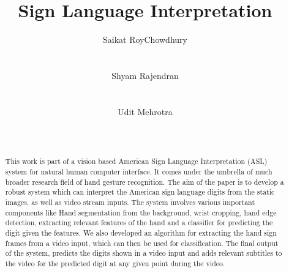\documentclass{acm} %
\begin{document}
\sloppy %

\title{Sign Language Interpretation
}

\author{%
    \alignauthor Saikat RoyChowdhury \\
    \\
    \\
    \alignauthor Shyam Rajendran\\
    \\
    \\
    \alignauthor Udit Mehrotra\\
    \\
    \\
}
\maketitle

\begin{abstract}
This work is part of a vision based American Sign Language Interpretation (ASL) system for natural human computer interface. It comes under the umbrella of much broader research field of hand gesture recognition. The aim of the paper is to develop a robust system which can interpret the American sign language digits from the static images, as well as video stream inputs. The system involves various important components like Hand segmentation from the background, wrist cropping, hand edge detection, extracting relevant features of the hand and a classifier for predicting the digit given the features. We also developed an algorithm for extracting the hand sign frames from a video input, which can then be used for classification. The final output of the system, predicts the digits shown in a video input and adds relevant subtitles to the video for the predicted digit at any given point during the video.
\end{abstract}

\end{document}
